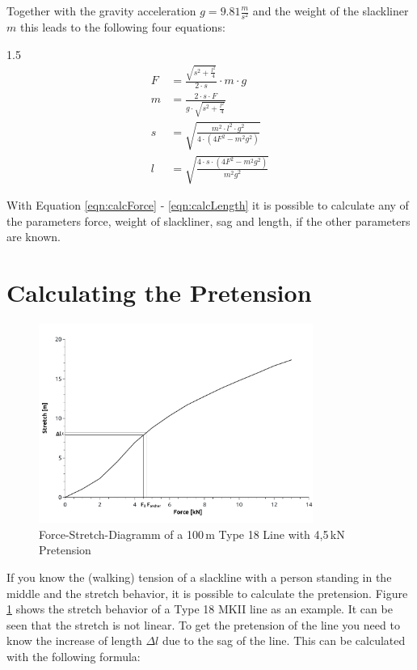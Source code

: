 Together with the gravity acceleration $g = 9.81\frac{m}{s^2}$ and the weight of the slackliner $m$ this leads to the following four equations:

\begin{spreadlines}{1.5\baselineskip}
\begin{align}
	F &= \frac{\sqrt{s^2 + \frac{l^2}{4}}}{2\cdot s} \cdot m\cdot g \label{eqn:calcForce} \\
	m &= \frac{2\cdot s\cdot F}{g\cdot\sqrt{s^2 + \frac{l^2}{4}}} \label{eqn:calcWeight} \\
	s &= \sqrt{ \frac{m^2\cdot l^2\cdot g^2}{4\cdot(4F^2 - m^2g^2)} } \label{eqn:calSag} \\
	l &= \sqrt{ \frac{4\cdot s\cdot (4F^2 - m^2g^2)}{m^2g^2} } \label{eqn:calcLength} 
\end{align}
\end{spreadlines}

With Equation \ref{eqn:calcForce} - \ref{eqn:calcLength} it is possible to calculate any of the parameters force, weight of slackliner, sag and length, if the other parameters are known.

\section{Calculating the Pretension}

\begin{figure}[htb] \centering
	\includegraphics[width=0.8\textwidth]{images/forceStretchDiagram.pdf}
	\caption{Force-Stretch-Diagramm of a 100\,m Type 18 Line with 4,5\,kN Pretension}
	\label{fig:forceStretchDiagramm}
\end{figure}

If you know the (walking) tension of a slackline with a person standing in the middle and the stretch behavior, it is possible to calculate the pretension. Figure \ref{fig:forceStretchDiagramm} shows the stretch behavior of a Type 18 MKII line as an example. It can be seen that the stretch is not linear. To get the pretension of the line you need to know the increase of length $\Delta l$ due to the sag of the line. This can be calculated with the following formula:

